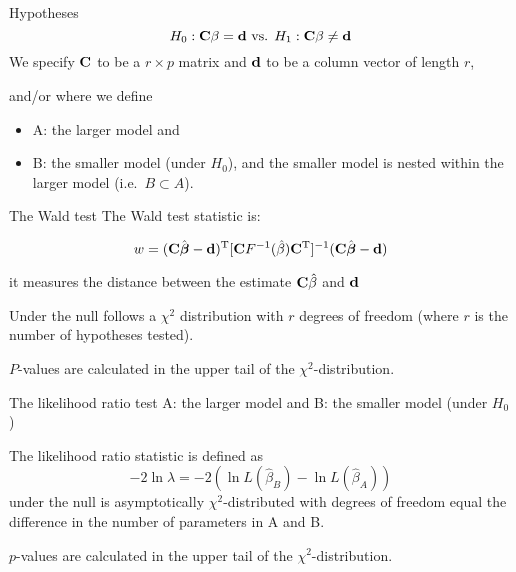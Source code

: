 \documentclass[
  ignorenonframetext,
]{beamer}
\providecommand{\tightlist}{%
  \setlength{\itemsep}{0pt}\setlength{\parskip}{0pt}}
\begin{document}
\begin{frame}{Hypotheses}
\label{hypotheses}
\[
H_0: {\bf C}{\bf \beta}={\bf d} \text{ vs. } H_1: {\bf C}{\bf \beta}\neq {\bf d}
\] We specify \({\bf C}\) to be a \(r \times p\) matrix and \({\bf d}\)
to be a column vector of length \(r\),

and/or where we define

\begin{itemize}
\tightlist
\item
  A: the larger model and
\item
  B: the smaller model (under \(H_0\)), and the smaller model is nested
  within the larger model (i.e.~\(B \subset A\)).
\end{itemize}
\end{frame}

\begin{frame}
\begin{block}{The Wald test}
\label{the-wald-test}
The Wald test statistic is:

\[
w=({\bf C} \hat{\boldsymbol{\beta}}-{\bf d})^{\text T}[{\bf C}F^{-1}(\hat{\beta}){\bf C}^{\text T}]^{-1}({\bf C}\hat{{\boldsymbol \beta}}-{\bf d})
\]

it measures the distance between the estimate \({\bf C}\hat{\beta}\) and
\({\bf d}\)

Under the null follows a \(\chi^2\) distribution with \(r\) degrees of
freedom (where \(r\) is the number of hypotheses tested).

\(P\)-values are calculated in the upper tail of the
\(\chi^2\)-distribution.
\end{block}
\end{frame}

\begin{frame}
\begin{block}{The likelihood ratio test}
\label{the-likelihood-ratio-test}
A: the larger model and B: the smaller model (under \(H_0\))

The likelihood ratio statistic is defined as
\[- 2\ln \lambda=-2(\ln L(\hat{\beta}_B)-\ln L(\hat{\beta}_A)) \] under
the null is asymptotically \(\chi^2\)-distributed with degrees of
freedom equal the difference in the number of parameters in A and B.

\(p\)-values are calculated in the upper tail of the
\(\chi^2\)-distribution.
\end{block}
\end{frame}
\end{document}
